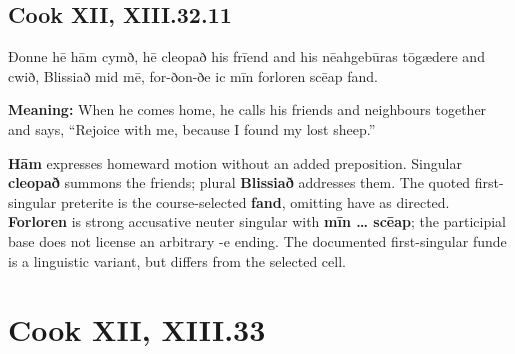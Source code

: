 \par\begin{minipage}{\linewidth}\raggedright
\subsection*{Cook XII, XIII.32.11}

Ðonne hē hām cymð, hē cleopað his frīend and his nēahgebūras tōgædere and cwið, Blissiað mid mē, for-ðon-ðe ic mīn forloren scēap fand.

\textbf{Meaning:} When he comes home, he calls his friends and neighbours together and says, “Rejoice with me, because I found my lost sheep.”

\textbf{Hām} expresses homeward motion without an added preposition. Singular \textbf{cleopað} summons the friends; plural \textbf{Blissiað} addresses them. The quoted first-singular preterite is the course-selected \textbf{fand}, omitting have as directed. \textbf{Forloren} is strong accusative neuter singular with \textbf{mīn … scēap}; the participial base does not license an arbitrary -e ending. The documented first-singular funde is a linguistic variant, but differs from the selected cell.

\end{minipage}\par\addvspace{4pt}

\clearpage
\section*{Cook XII, XIII.33}

